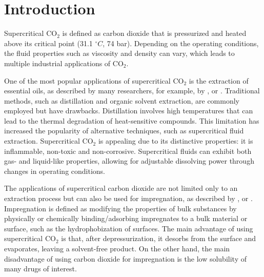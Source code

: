 \documentclass[a4paper,fleqn]{cas-dc}
\begin{document}
	\maketitle
	
	
	\section{Introduction}
	
	Supercritical CO$_2$ is defined as carbon dioxide that is pressurized and heated above its critical point (31.1 $^\circ C$, 74 bar). Depending on the operating conditions, the fluid properties such as viscosity and density can vary, which leads to multiple industrial applications of CO$_2$.
	
	One of the most popular applications of supercritical CO$_2$ is the extraction of essential oils, as described by many researchers, for example, by \citet{Sodeifian2017}, \citet{Reverchon1993} or \citet{Sovova1994}. Traditional methods, such as distillation and organic solvent extraction, are commonly employed but have drawbacks. Distillation involves high temperatures that can lead to the thermal degradation of heat-sensitive compounds. This limitation has increased the popularity of alternative techniques, such as supercritical fluid extraction. Supercritical CO$_2$ is appealing due to its distinctive properties: it is inflammable, non-toxic and non-corrosive. Supercritical fluids can exhibit both gas- and liquid-like properties, allowing for adjustable dissolving power through changes in operating conditions.
	
	The applications of supercritical carbon dioxide are not limited only to an extraction process but can also be used for impregnation, as described by \citet{Weidner2018}, \citet{Machado2022} or \citet{Fathi2022}. Impregnation is defined as modifying the properties of bulk substances by physically or chemically binding/adsorbing impregnates to a bulk material or surface, such as the hydrophobization of surfaces. The main advantage of using supercritical CO$_2$ is that, after depressurization, it desorbs from the surface and evaporates, leaving a solvent-free product. On the other hand, the main disadvantage of using carbon dioxide for impregnation is the low solubility of many drugs of interest.
	
\end{document}
